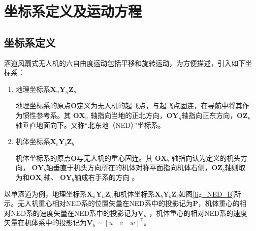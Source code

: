\section{坐标系定义及运动方程}
\subsection{坐标系定义}
涵道风扇式无人机的六自由度运动包括平移和旋转运动，为方便描述，引入如下坐标系：
\begin{enumerate}
	\item	地理坐标系${\bm{X}_n}{\bm{Y}_n}{\bm{Z}_n}$
	
	地理坐标系的原点$ \bm{O} $定义为无人机的起飞点，与起飞点固连，在导航中将其作为惯性参考系。其 $ \bm{O}\bm{X}_n $ 轴指向当地的正北方向，$ \bm{O}\bm{Y}_n$轴指向正东方向，$ \bm{O}\bm{Z}_n $轴垂直地面向下。又称“北东地（NED）”坐标系。
	 
	\item	机体坐标系${\bm{X}_b}{\bm{Y}_b}{\bm{Z}_b}$
	
	机体坐标系的原点$ \bm{O} $与无人机的重心固连。其 $ \bm{O}\bm{X}_b $ 轴指向认为定义的机头方向， $ \bm{O}\bm{Y}_b  $轴垂直于机头方向所在的机体对称平面指向机体右侧，$ \bm{O}\bm{Z}_b $轴则取为和$ \bm{O}\bm{X}_b $轴、 $ \bm{O}\bm{Y}_b  $轴成右手系的方向 。
\end{enumerate}	

以单涵道为例，地理坐标系${\bm{X}_n}{\bm{Y}_n}{\bm{Z}_n}$和机体坐标系${\bm{X}_b}{\bm{Y}_b}{\bm{Z}_b}$如图\ref{fig_NED_B}所示。无人机重心相对NED系的位置矢量在NED系中的投影记为$\bm{P} $，机体重心的相对NED系的速度矢量在NED系中的投影记为$ \bm{V}_n$ ，机体重心的相对NED系的速度矢量在机体系中的投影记为$ \bm{V}_b=[u \quad v \quad w]^\top $。
	
